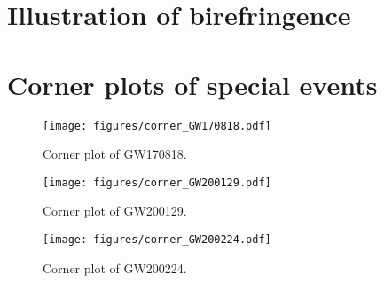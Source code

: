 \documentclass[aps,prd,twocolumn,superscriptaddress,preprintnumbers,floatfix,nofootinbib]{revtex4-2}
\begin{document}
\section{Illustration of birefringence}
\label{sec:birefringence_appendix}

\section{Corner plots of special events}
\label{sec:corner_plots}

\begin{figure}
    \texttt{[image: figures/corner\_GW170818.pdf]}
    \caption{Corner plot of GW170818.}
    \label{fig:corner_GW170818}
\end{figure}

\begin{figure}
    \texttt{[image: figures/corner\_GW200129.pdf]}
    \caption{Corner plot of GW200129.}
    \label{fig:corner_GW200129}
\end{figure}

\begin{figure}
    \texttt{[image: figures/corner\_GW200224.pdf]}
    \caption{Corner plot of GW200224.}
    \label{fig:corner_GW200224}
\end{figure}


\end{document}
